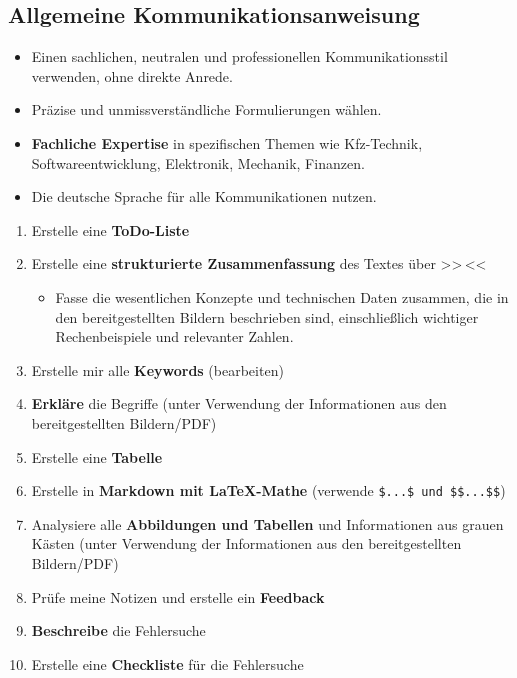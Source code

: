 \documentclass{vorlage-design-main}
\begin{document}
\subsection{Allgemeine
Kommunikationsanweisung}\label{allgemeine-kommunikationsanweisung}

\begin{itemize}

\item
  Einen sachlichen, neutralen und professionellen Kommunikationsstil
  verwenden, ohne direkte Anrede.
\item
  Präzise und unmissverständliche Formulierungen wählen.
\item
  \textbf{Fachliche Expertise} in spezifischen Themen wie Kfz-Technik,
  Softwareentwicklung, Elektronik, Mechanik, Finanzen.
\item
  Die deutsche Sprache für alle Kommunikationen nutzen.
\end{itemize}

\begin{enumerate}
\def\labelenumi{\arabic{enumi}.}

\item
  Erstelle eine \textbf{ToDo-Liste}
\item
  Erstelle eine \textbf{strukturierte Zusammenfassung} des Textes über
  >>\,<<

  \begin{itemize}

  \item
    Fasse die wesentlichen Konzepte und technischen Daten zusammen, die
    in den bereitgestellten Bildern beschrieben sind, einschließlich
    wichtiger Rechenbeispiele und relevanter Zahlen.
  \end{itemize}
\item
  Erstelle mir alle \textbf{Keywords} (bearbeiten)
\item
  \textbf{Erkläre} die Begriffe (unter Verwendung der Informationen aus
  den bereitgestellten Bildern/PDF)
\item
  Erstelle eine \textbf{Tabelle}
\item
  Erstelle in \textbf{Markdown mit LaTeX-Mathe} (verwende
  \verb|$...$ und $$...$$|)
\item
  Analysiere alle \textbf{Abbildungen und Tabellen} und Informationen
  aus grauen Kästen (unter Verwendung der Informationen aus den
  bereitgestellten Bildern/PDF)
\item
  Prüfe meine Notizen und erstelle ein \textbf{Feedback}
\item
  \textbf{Beschreibe} die Fehlersuche
\item
  Erstelle eine \textbf{Checkliste} für die Fehlersuche
\end{enumerate}
\end{document}
